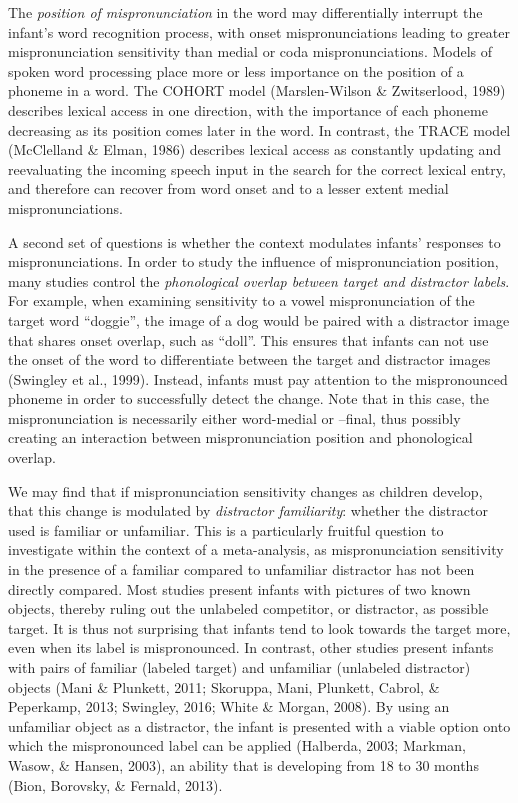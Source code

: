 \documentclass[man]{apa6}
\begin{document}
The \emph{position of mispronunciation} in the word may differentially interrupt the infant's word recognition process, with onset mispronunciations leading to greater mispronunciation sensitivity than medial or coda mispronunciations. Models of spoken word processing place more or less importance on the position of a phoneme in a word. The COHORT model (Marslen-Wilson \& Zwitserlood, 1989) describes lexical access in one direction, with the importance of each phoneme decreasing as its position comes later in the word. In contrast, the TRACE model (McClelland \& Elman, 1986) describes lexical access as constantly updating and reevaluating the incoming speech input in the search for the correct lexical entry, and therefore can recover from word onset and to a lesser extent medial mispronunciations.

A second set of questions is whether the context modulates infants' responses to mispronunciations. In order to study the influence of mispronunciation position, many studies control the \emph{phonological overlap between target and distractor labels}. For example, when examining sensitivity to a vowel mispronunciation of the target word \enquote{doggie}, the image of a dog would be paired with a distractor image that shares onset overlap, such as \enquote{doll}. This ensures that infants can not use the onset of the word to differentiate between the target and distractor images (Swingley et al., 1999). Instead, infants must pay attention to the mispronounced phoneme in order to successfully detect the change. Note that in this case, the mispronunciation is necessarily either word-medial or --final, thus possibly creating an interaction between mispronunciation position and phonological overlap.

We may find that if mispronunciation sensitivity changes as children develop, that this change is modulated by \emph{distractor familiarity}: whether the distractor used is familiar or unfamiliar. This is a particularly fruitful question to investigate within the context of a meta-analysis, as mispronunciation sensitivity in the presence of a familiar compared to unfamiliar distractor has not been directly compared. Most studies present infants with pictures of two known objects, thereby ruling out the unlabeled competitor, or distractor, as possible target. It is thus not surprising that infants tend to look towards the target more, even when its label is mispronounced. In contrast, other studies present infants with pairs of familiar (labeled target) and unfamiliar (unlabeled distractor) objects (Mani \& Plunkett, 2011; Skoruppa, Mani, Plunkett, Cabrol, \& Peperkamp, 2013; Swingley, 2016; White \& Morgan, 2008). By using an unfamiliar object as a distractor, the infant is presented with a viable option onto which the mispronounced label can be applied (Halberda, 2003; Markman, Wasow, \& Hansen, 2003), an ability that is developing from 18 to 30 months (Bion, Borovsky, \& Fernald, 2013).
\end{document}
